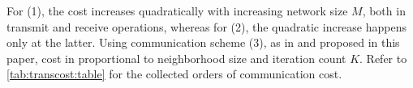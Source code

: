 \documentclass{article}
\begin{document}
For (1), the cost increases quadratically with increasing network size \(M\), both in transmit and receive operations, whereas for (2), the quadratic increase happens only at the latter.
Using communication scheme (3), as in \cite{yuDistributedBlindSystem2014,liuDistributedBlindIdentification2016} and proposed in this paper, cost in proportional to neighborhood size and iteration count \(K\).
Refer to \autoref{tab:transcost:table} for the collected orders of communication cost.

%     
\end{document}
